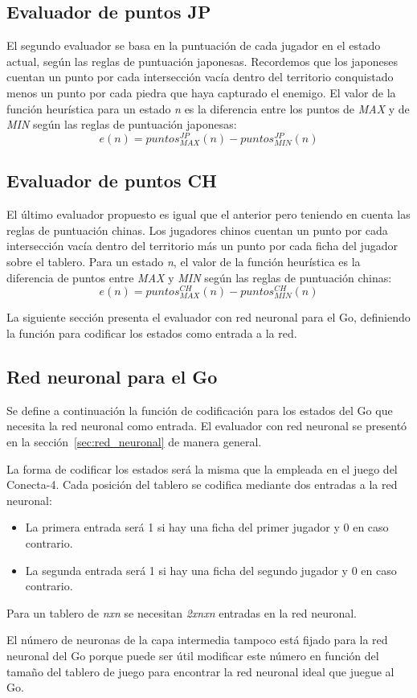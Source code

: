 \subsection{Evaluador de puntos JP}
\label{ssec:evaluador_puntosJP}
El segundo evaluador se basa en la puntuación de cada jugador en el estado actual, según las reglas de puntuación japonesas.
Recordemos que los japoneses cuentan un punto por cada intersección vacía dentro del territorio conquistado menos un punto por cada piedra que haya capturado el enemigo.
El valor de la función heurística para un estado \textit{n} es la diferencia entre los puntos de \textit{MAX} y de \textit{MIN} según las reglas de puntuación japonesas:
\begin{displaymath}
e(n) = puntos_{MAX}^{JP}(n) - puntos_{MIN}^{JP}(n)
\end{displaymath}

\subsection{Evaluador de puntos CH}
\label{ssec:evaluador_puntosCH}
El último evaluador propuesto es igual que el anterior pero teniendo en cuenta las reglas de puntuación chinas.
Los jugadores chinos cuentan un punto por cada intersección vacía dentro del territorio más un punto por cada ficha del jugador sobre el tablero.
Para un estado \textit{n}, el valor de la función heurística es la diferencia de puntos entre \textit{MAX} y \textit{MIN} según las reglas de puntuación chinas:
\begin{displaymath}
e(n) = puntos_{MAX}^{CH}(n) - puntos_{MIN}^{CH}(n)
\end{displaymath}

\bigskip
La siguiente sección presenta el evaluador con red neuronal para el Go, definiendo la función para codificar los estados como entrada a la red.

\subsection{Red neuronal para el Go}
\label{ssec:redNeuronal_go}
Se define a continuación la función de codificación para los estados del Go que necesita la red neuronal como entrada.
El evaluador con red neuronal se presentó en la sección~\ref{sec:red_neuronal} de manera general.

\bigskip
La forma de codificar los estados será la misma que la empleada en el juego del Conecta-4.
Cada posición del tablero se codifica mediante dos entradas a la red neuronal:
\begin{itemize}
\renewcommand{\labelitemi}{-}
	\item La primera entrada será 1 si hay una ficha del primer jugador y 0 en caso contrario.
	\item La segunda entrada será 1 si hay una ficha del segundo jugador y 0 en caso contrario.
\end{itemize}
Para un tablero de \textit{nxn} se necesitan \textit{2xnxn} entradas en la red neuronal.

El número de neuronas de la capa intermedia tampoco está fijado para la red neuronal del Go porque puede ser útil modificar este número en función del tamaño del tablero de juego para encontrar la red neuronal ideal que juegue al Go.
